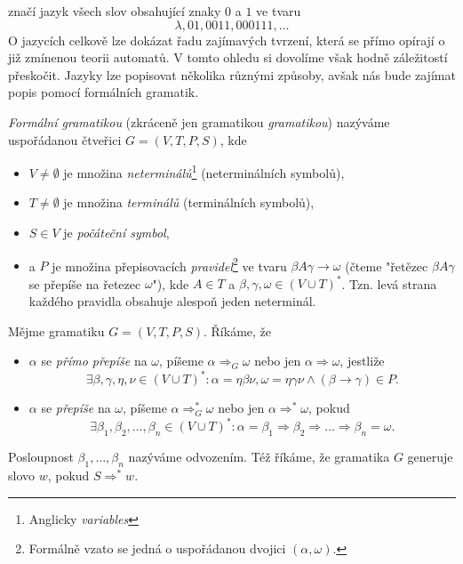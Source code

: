 značí jazyk všech slov obsahující znaky $0$ a $1$ ve tvaru
\[\lambda,01,0011,000111,\ldots\]
O jazycích celkově lze dokázat řadu zajímavých tvrzení, která se přímo opírají o již zmínenou teorii automatů. V tomto ohledu si dovolíme však hodně záležitostí přeskočit. Jazyky lze popisovat několika různými způsoby, avšak nás bude zajímat popis pomocí formálních gramatik.
\begin{definition}\label{def:formalni-gramatika}
    \emph{Formální gramatikou} (zkráceně jen gramatikou \emph{gramatikou}) nazýváme uspořádanou čtveřici $G=(V,T,P,S)$, kde
    \begin{itemize}
        \item $V\neq\emptyset$ je množina \emph{neterminálů}\footnote{Anglicky \emph{variables}} (neterminálních symbolů),
        \item $T\neq\emptyset$ je množina \emph{terminálů} (terminálních symbolů),
        \item $S\in V$ je \emph{počáteční symbol},
        \item a $P$ je množina přepisovacích \emph{pravidel}\footnote{Formálně vzato se jedná o uspořádanou dvojici $(\alpha,\omega)$.} ve tvaru $\beta A\gamma\to\omega$ (čteme "řetězec $\beta A\gamma$ se přepíše na řetezec $\omega$"), kde $A\in T$ a $\beta,\gamma,\omega\in(V\cup T)^*$. Tzn. levá strana každého pravidla obsahuje alespoň jeden neterminál.
    \end{itemize}
\end{definition}
\begin{definition}\label{def:odvozeni-slova}
    Mějme gramatiku $G=(V,T,P,S)$. Říkáme, že
    \begin{itemize}
        \item $\alpha$ se \emph{přímo přepíše} na $\omega$, píšeme $\alpha\Rightarrow_G\omega$ nebo jen $\alpha\Rightarrow\omega$, jestliže
        \[\exists\beta,\gamma,\eta,\nu\in(V\cup T)^*: \alpha=\eta\beta\nu,\omega=\eta\gamma\nu\land(\beta\to\gamma)\in P.\]
        \item $\alpha$ se \emph{přepíše} na $\omega$, píšeme $\alpha\Rightarrow_G^*\omega$ nebo jen $\alpha\Rightarrow^*\omega$, pokud
        \[\exists\beta_1,\beta_2,\ldots,\beta_n\in(V\cup T)^*:\alpha=\beta_1\Rightarrow\beta_2\Rightarrow\dots\Rightarrow\beta_n=\omega.\]
    \end{itemize}
    Posloupnost $\beta_1,\ldots,\beta_n$ nazýváme odvozením. Též říkáme, že gramatika $G$ generuje slovo $w$, pokud $S\Rightarrow^* w$.
\end{definition}
